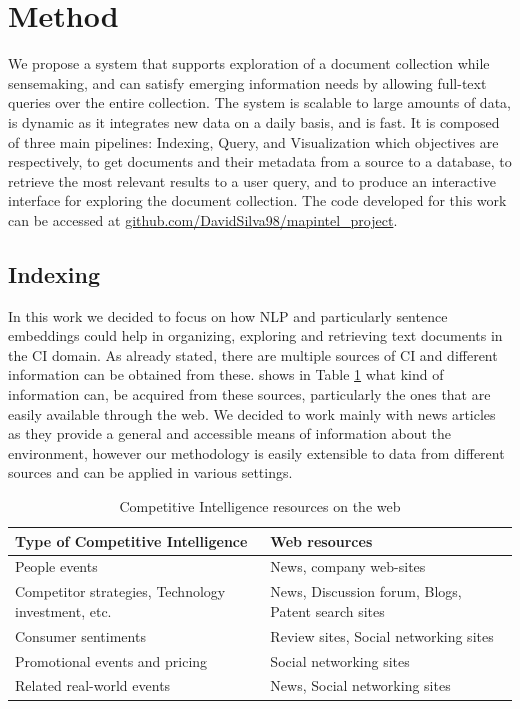 \documentclass[a4paper]{article}
\begin{document}
\section*{Method}
We propose a system that supports exploration of a document collection while sensemaking, and can satisfy emerging information needs by allowing full-text queries over the entire collection.
The system is scalable to large amounts of data, is dynamic as it integrates new data on a daily basis, and is fast. It is composed of three main pipelines: Indexing, Query, and Visualization which objectives are respectively, to get documents and their metadata from a source to a database, to retrieve the most relevant results to a user query, and to produce an interactive interface for exploring the document collection. The code developed for this work can be accessed at \href{https://github.com/DavidSilva98/mapintel_project}{github.com/DavidSilva98/mapintel\_project}.

\subsection*{Indexing}
In this work we decided to focus on how NLP and particularly sentence embeddings could help in organizing, exploring and retrieving text documents in the CI domain. As already stated, there are multiple sources of CI and different information can be obtained from these. \citet{dey2011} shows in Table \ref{ci_resources} what kind of information can, be acquired from these sources, particularly the ones that are easily available through the web. We decided to work mainly with news articles as they provide a general and accessible means of information about the environment, however our methodology is easily extensible to data from different sources and can be applied in various settings. 

\renewcommand{\arraystretch}{1.3}
\begin{table}[h!]
  \begin{center}
    \caption{Competitive Intelligence resources on the web}
    \label{ci_resources}
    \begin{tabular}{ |p{6cm}|p{6cm}| }
	  \hline
      \textbf{Type of Competitive Intelligence} & \textbf{Web resources} \\
      \hline
	  People events & News, company web-sites \\
	  \hline
	  Competitor strategies, Technology investment, etc. & News, Discussion forum, Blogs, Patent search sites \\
	  \hline
	  Consumer sentiments & Review sites, Social networking sites \\
	  \hline
	  Promotional events and pricing & Social networking sites \\
	  \hline
	  Related real-world events & News, Social networking sites \\
	  \hline
    \end{tabular}
  \end{center}
\end{table}
\end{document}
